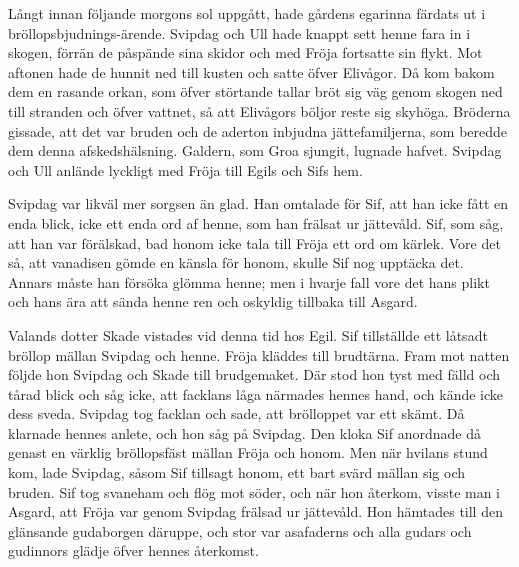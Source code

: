 \protect\hypertarget{lb1625905.xhtmlux5cux23start112}{}{}\protect\hypertarget{lb1625905.xhtmlux5cux23start112-a}{}{}\protect\hypertarget{lb1625905.xhtmlux5cux23start112-b}{}{}\protect\hypertarget{lb1625905.xhtmlux5cux23start112-c}{}{}\protect\hypertarget{lb1625905.xhtmlux5cux23start112-d}{}{}

Långt innan följande morgons sol uppgått, hade gårdens egarinna färdats
ut i bröllopsbjudnings-ärende. Svipdag och Ull hade knappt sett henne
fara in i skogen, förrän de påspände sina skidor och med Fröja fortsatte
sin flykt. Mot aftonen hade de hunnit ned till kusten och satte öfver
Elivågor. Då kom bakom dem en rasande orkan, som öfver störtande tallar
bröt sig väg genom skogen ned till stranden och öfver vattnet, så att
Elivågors böljor reste sig skyhöga. Bröderna gissade, att det var bruden
och de aderton inbjudna jättefamiljerna, som beredde dem denna
afskedshälsning. Galdern, som Groa sjungit, lugnade hafvet. Svipdag och
Ull anlände lyckligt med Fröja till Egils och Sifs hem.

Svipdag var likväl mer sorgsen än glad. Han omtalade för Sif, att han
icke fått en enda blick, icke ett enda ord af henne, som han frälsat ur
jättevåld. Sif, som såg, att han var förälskad, bad honom icke tala till
Fröja ett ord om kärlek. Vore det så, att vanadisen gömde en känsla för
honom, skulle Sif nog upptäcka det. Annars måste han försöka glömma
henne; men i hvarje fall vore det hans plikt och hans ära att sända
henne ren och oskyldig tillbaka till Asgard.

Valands dotter Skade vistades vid denna tid hos Egil. Sif tillställde
ett låtsadt bröllop mällan Svipdag och henne. Fröja kläddes till
brudtärna. Fram mot natten följde hon Svipdag och Skade till
brudgemaket. Där stod hon tyst med fälld och tårad blick och såg icke,
att facklans låga närmades hennes hand, och kände icke dess sveda.
Svipdag tog facklan och sade, att brölloppet var ett skämt. Då klarnade
hennes anlete, och hon såg på Svipdag. Den kloka Sif anordnade då genast
en värklig bröllopsfäst mällan Fröja och honom. Men när hvilans stund
kom, lade Svipdag, såsom Sif tillsagt honom, ett bart svärd mällan sig
och bruden. Sif tog svaneham och flög mot söder, och när hon återkom,
visste man i Asgard, att Fröja var genom Svipdag frälsad ur jättevåld.
Hon hämtades till den glänsande gudaborgen däruppe, och stor var
asafaderns och alla gudars och gudinnors glädje öfver hennes återkomst.

\protect\hypertarget{lb1625905.xhtmlux5cux23start113}{}{}\protect\hypertarget{lb1625905.xhtmlux5cux23start113-a}{}{}\protect\hypertarget{lb1625905.xhtmlux5cux23start113-b}{}{}\protect\hypertarget{lb1625905.xhtmlux5cux23start113-c}{}{}\protect\hypertarget{lb1625905.xhtmlux5cux23start113-d}{}{}

